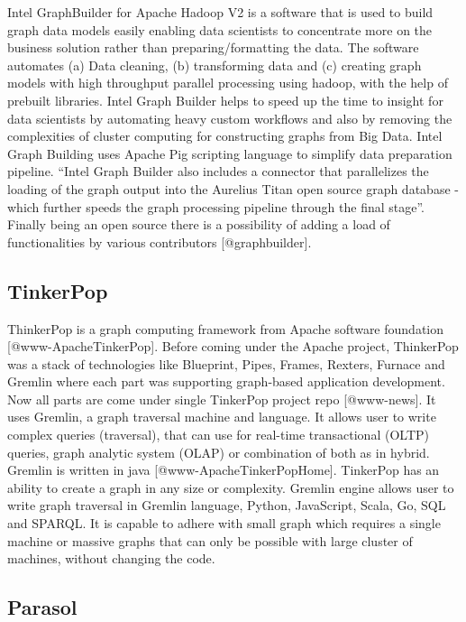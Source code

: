 Intel GraphBuilder for Apache Hadoop V2 is a software that is used to
build graph data models easily enabling data scientists to concentrate
more on the business solution rather than preparing/formatting the
data. The software automates (a) Data cleaning, (b) transforming data and
(c) creating graph models with high throughput parallel processing using
hadoop, with the help of prebuilt libraries. Intel Graph Builder helps
to speed up the time to insight for data scientists by automating
heavy custom workflows and also by removing the complexities of
cluster computing for constructing graphs from Big Data. Intel Graph
Building uses Apache Pig scripting language to simplify data
preparation pipeline.  ``Intel Graph Builder also includes a connector
that parallelizes the loading of the graph output into the Aurelius
Titan open source graph database - which further speeds the graph
processing pipeline through the final stage''.  Finally being an open
source there is a possibility of adding a load of functionalities by
various contributors [@graphbuilder].

    
\subsection{TinkerPop}
    
ThinkerPop is a graph computing framework from Apache software
foundation [@www-ApacheTinkerPop]. Before coming under the Apache
project, ThinkerPop was a stack of technologies like Blueprint, Pipes,
Frames, Rexters, Furnace and Gremlin where each part was supporting
graph-based application development. Now all parts are come under
single TinkerPop project repo [@www-news]. It uses Gremlin, a
graph traversal machine and language. It allows user to write complex
queries (traversal), that can use for real-time transactional (OLTP)
queries, graph analytic system (OLAP) or combination of both as in
hybrid. Gremlin is written in
java [@www-ApacheTinkerPopHome]. TinkerPop has an ability to
create a graph in any size or complexity. Gremlin engine allows user
to write graph traversal in Gremlin language, Python, JavaScript,
Scala, Go, SQL and SPARQL. It is capable to adhere with small graph
which requires a single machine or massive graphs that can only be
possible with large cluster of machines, without changing the code.

\subsection{Parasol}

